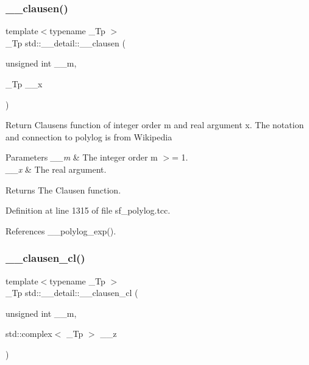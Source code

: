 \subsubsection{\texorpdfstring{\+\_\+\+\_\+clausen()}{\_\_clausen()}\hspace{0.1cm}{\footnotesize\ttfamily [2/2]}}
{\footnotesize\ttfamily template$<$typename \+\_\+\+Tp $>$ \\
\+\_\+\+Tp std\+::\+\_\+\+\_\+detail\+::\+\_\+\+\_\+clausen (\begin{DoxyParamCaption}\item[{unsigned int}]{\+\_\+\+\_\+m,  }\item[{\+\_\+\+Tp}]{\+\_\+\+\_\+x }\end{DoxyParamCaption})}

Return Clausen\textquotesingle{}s function of integer order m and real argument x. The notation and connection to polylog is from Wikipedia


\begin{DoxyParams}{Parameters}
{\em \+\_\+\+\_\+m} & The integer order m $>$= 1. \\
\hline
{\em \+\_\+\+\_\+x} & The real argument. \\
\hline
\end{DoxyParams}
\begin{DoxyReturn}{Returns}
The Clausen function. 
\end{DoxyReturn}


Definition at line 1315 of file sf\+\_\+polylog.\+tcc.



References \+\_\+\+\_\+polylog\+\_\+exp().

\mbox{\label{namespacestd_1_1____detail_ab09b3cb1a96ba96e7fddadd0ea717b1c}} 
\subsubsection{\texorpdfstring{\+\_\+\+\_\+clausen\+\_\+cl()}{\_\_clausen\_cl()}\hspace{0.1cm}{\footnotesize\ttfamily [1/2]}}
{\footnotesize\ttfamily template$<$typename \+\_\+\+Tp $>$ \\
\+\_\+\+Tp std\+::\+\_\+\+\_\+detail\+::\+\_\+\+\_\+clausen\+\_\+cl (\begin{DoxyParamCaption}\item[{unsigned int}]{\+\_\+\+\_\+m,  }\item[{std\+::complex$<$ \+\_\+\+Tp $>$}]{\+\_\+\+\_\+z }\end{DoxyParamCaption})}

